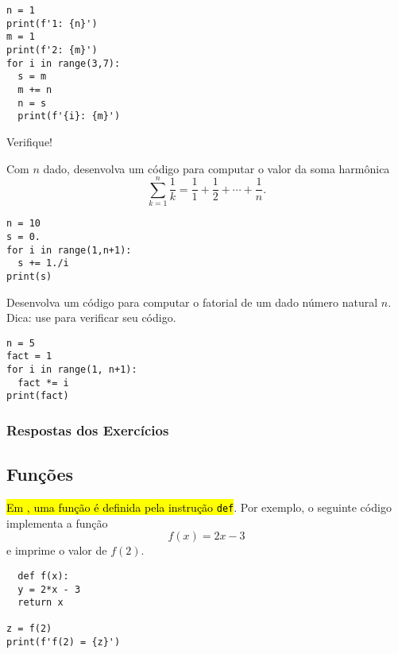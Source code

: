 \begin{lstlisting}
n = 1
print(f'1: {n}')
m = 1
print(f'2: {m}')
for i in range(3,7):
  s = m
  m += n
  n = s
  print(f'{i}: {m}')
\end{lstlisting}

Verifique!

\begin{exer}
  Com $n$ dado, desenvolva um código para computar o valor da soma harmônica
  \begin{equation}
    \sum_{k=1}^n \frac{1}{k} = \frac{1}{1} + \frac{1}{2} + \cdots + \frac{1}{n}.
  \end{equation}
\end{exer}
\begin{resp}
  
\begin{lstlisting}
n = 10
s = 0.
for i in range(1,n+1):
  s += 1./i
print(s)
\end{lstlisting}

\end{resp}

\begin{exer}
  Desenvolva um código para computar o fatorial de um dado número natural $n$. Dica: use {\PYTHONmathDOTfactorial} para verificar seu código.
\end{exer}
\begin{resp}
  
\begin{lstlisting}
n = 5
fact = 1
for i in range(1, n+1):
  fact *= i
print(fact)
\end{lstlisting}

\end{resp}

\ifisbook 
\subsubsection*{Respostas dos Exercícios}
\shipoutAnswer
\fi


\subsection{Funções}

\hl{Em {\python}, uma função é definida pela instrução \texttt{def}}. Por exemplo, o seguinte código implementa a função
\begin{equation}
  f(x) = 2x - 3
\end{equation}
e imprime o valor de $f(2)$.

\begin{lstlisting}
  def f(x):
  y = 2*x - 3
  return x

z = f(2)
print(f'f(2) = {z}')
\end{lstlisting}

